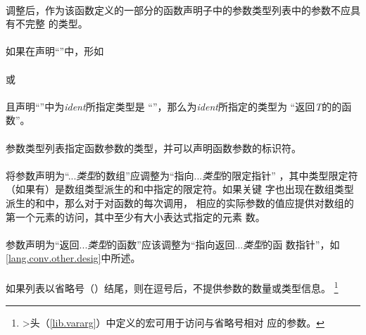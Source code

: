 \paragraph{}
调整后，作为该函数定义的一部分的函数声明子中的参数类型列表中的参数不应具有不完整
的类型。

\semantic
\paragraph{}
如果在声明``''中，形如                                        \\
\mbox{\hspace{4em}  \tm{)}}                    \\
或                                                                            \\
\mbox{\hspace{4em}  \tm{)}}              \\
且声明``''中为\textit{ident}所指定类型是
``''，那么为\textit{ident}所指定的类型为
``返回\textit{T}的的函数''。

\paragraph{}
参数类型列表指定函数参数的类型，并可以声明函数参数的标识符。

\paragraph{}
将参数声明为``...\textit{类型}的数组''应调整为``指向...\textit{类型}的限定指针''
，其中类型限定符（如果有）是数组类型派生的\tm{[}和\tm{]}中指定的限定符。如果关键
字也出现在数组类型派生的\tm{[}和\tm{]}中，那么对于对函数的每次调用，
相应的实际参数的值应提供对数组的第一个元素的访问，其中至少有大小表达式指定的元素
数。

\paragraph{}
参数声明为``返回...\textit{类型}的函数''应该调整为``指向返回...\textit{类型}的函
数指针''，如\ref{lang.conv.other.desig}中所述。

\paragraph{}
如果列表以省略号（）结尾，则在逗号后，不提供参数的数量或类型信息。
\footnote{>头（\ref{lib.vararg}）中定义的宏可用于访问与省略号相对
应的参数。}

